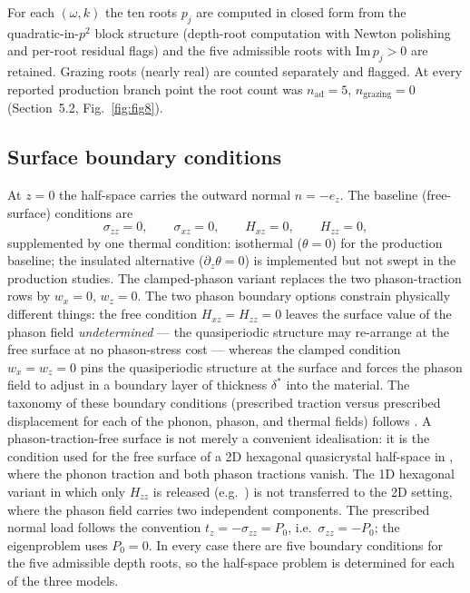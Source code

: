 \documentclass[11pt]{article}
\newcommand{\om}{\omega}
\newcommand{\sig}{\sigma}
\newcommand{\tht}{\theta}
\begin{document}
For each $(\om,k)$ the ten roots $p_j$ are computed in closed form from the quadratic-in-$p^2$ block structure (depth-root computation with Newton polishing and per-root residual flags) and the five admissible roots with $\mathrm{Im}\,p_j>0$ are retained. Grazing roots (nearly real) are counted separately and flagged. At every reported production branch point the root count was $n_{\mathrm{ad}}=5$, $n_{\mathrm{grazing}}=0$ (Section~5.2, Fig.~\ref{fig:fig8}).

\subsection{Surface boundary conditions}

At $z=0$ the half-space carries the outward normal $n=-e_z$. The baseline (free-surface) conditions are
\begin{equation}
\sig_{zz}=0,\qquad \sig_{xz}=0,\qquad H_{xz}=0,\qquad H_{zz}=0, \label{eq:BCmech}
\end{equation}
supplemented by one thermal condition: isothermal ($\tht=0$) for the production baseline; the insulated alternative ($\partial_z\tht=0$) is implemented but not swept in the production studies. The clamped-phason variant replaces the two phason-traction rows by $w_x=0$, $w_z=0$. The two phason boundary options constrain physically different things: the free condition $H_{xz}=H_{zz}=0$ leaves the surface value of the phason field \emph{undetermined} --- the quasiperiodic structure may re-arrange at the free surface at no phason-stress cost --- whereas the clamped condition $w_x=w_z=0$ pins the quasiperiodic structure at the surface and forces the phason field to adjust in a boundary layer of thickness $\delta^*$ into the material. The taxonomy of these boundary conditions (prescribed traction versus prescribed displacement for each of the phonon, phason, and thermal fields) follows \cite{fan2011,ding2000}. A phason-traction-free surface is not merely a convenient idealisation: it is the condition used for the free surface of a 2D hexagonal quasicrystal half-space in \cite{wang2015}, where the phonon traction and both phason tractions vanish. The 1D hexagonal variant in which only $H_{zz}$ is released (e.g.\ \cite{zhang2023cryst}) is not transferred to the 2D setting, where the phason field carries two independent components. The prescribed normal load follows the convention $t_z=-\sig_{zz}=P_0$, i.e.\ $\sig_{zz}=-P_0$; the eigenproblem uses $P_0=0$. In every case there are five boundary conditions for the five admissible depth roots, so the half-space problem is determined for each of the three models.
\end{document}
